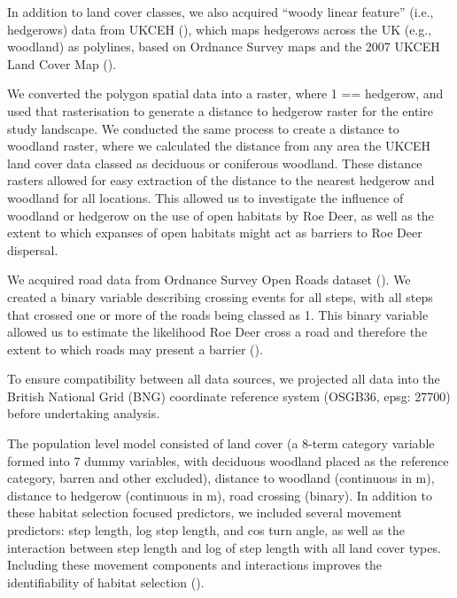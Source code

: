\documentclass[10pt,a4paper]{article}
\begin{document}
In addition to land cover classes, we also acquired ``woody linear feature'' (i.e., hedgerows) data from UKCEH (), which maps hedgerows across the UK (e.g., woodland) as polylines, based on Ordnance Survey maps and the 2007 UKCEH Land Cover Map ().

We converted the polygon spatial data into a raster, where 1 == hedgerow, and used that rasterisation to generate a distance to hedgerow raster for the entire study landscape.
We conducted the same process to create a distance to woodland raster, where we calculated the distance from any area the UKCEH land cover data classed as deciduous or coniferous woodland.
These distance rasters allowed for easy extraction of the distance to the nearest hedgerow and woodland for all locations.
This allowed us to investigate the influence of woodland or hedgerow on the use of open habitats by Roe Deer, as well as the extent to which expanses of open habitats might act as barriers to Roe Deer dispersal.

We acquired road data from Ordnance Survey Open Roads dataset ().
We created a binary variable describing crossing events for all steps, with all steps that crossed one or more of the roads being classed as 1.
This binary variable allowed us to estimate the likelihood Roe Deer cross a road and therefore the extent to which roads may present a barrier ().

To ensure compatibility between all data sources, we projected all data into the British National Grid (BNG) coordinate reference system (OSGB36, epsg: 27700) before undertaking analysis.

The population level model consisted of land cover (a 8-term category variable formed into 7 dummy variables, with deciduous woodland placed as the reference category, barren and other excluded), distance to woodland (continuous in m), distance to hedgerow (continuous in m), road crossing (binary).
In addition to these habitat selection focused predictors, we included several movement predictors: step length, log step length, and cos turn angle, as well as the interaction between step length and log of step length with all land cover types.
Including these movement components and interactions improves the identifiability of habitat selection ().
\end{document}
